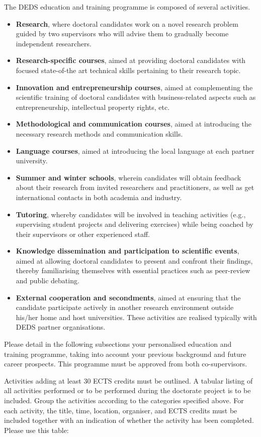 \documentclass[12pt]{article}
\begin{document}
The DEDS education and training programme is composed of several activities.
\begin{itemize}
\item \textbf{Research}, where doctoral candidates work on a novel research problem 
guided by two supervisors who will advise them to gradually become independent researchers.
\item \textbf{Research-specific courses}, aimed at providing doctoral candidates with focused
state-of-the art technical skills pertaining to their research topic.
\item \textbf{Innovation and entrepreneurship courses}, aimed at complementing the scientific training
of doctoral candidates with business-related aspects such as entrepreneurship,
intellectual property rights, etc.
\item \textbf{Methodological and communication courses}, aimed at introducing the necessary
research methods and communication skills.
\item \textbf{Language courses}, aimed at introducing the local language at each partner university.
\item \textbf{Summer and winter schools}, wherein candidates will obtain 
feedback about their research from invited researchers and practitioners,
as well as get international contacts in both academia and industry.
\item \textbf{Tutoring}, whereby candidates will be involved in teaching activities
(e.g., supervising student projects and delivering exercises) 
while being coached by their supervisors or other experienced staff.
\item \textbf{Knowledge dissemination and participation to scientific events}, aimed at allowing
doctoral candidates to present and confront their findings, thereby familiarising
themselves with essential practices such as peer-review and public debating.
\item \textbf{External cooperation and secondments}, aimed at ensuring that the candidate
participate actively in another research environment outside his/her home and host universities.
These activities are realised typically with DEDS partner organisations.
\end{itemize}

Please detail in the following subsections your personalised education and training programme,
taking into account your previous background and future career prospects. This programme must
be approved from both co-supervisors.

Activities adding at least 30 ECTS credits must be outlined.
A tabular listing of all activities performed or to be performed during the doctorate project is to be included. Group the activities according to the categories specified above. For each activity, the title, time, location, organiser, and ECTS credits must be included together with an indication of whether the activity has been completed.
Please use this table:
\end{document}
